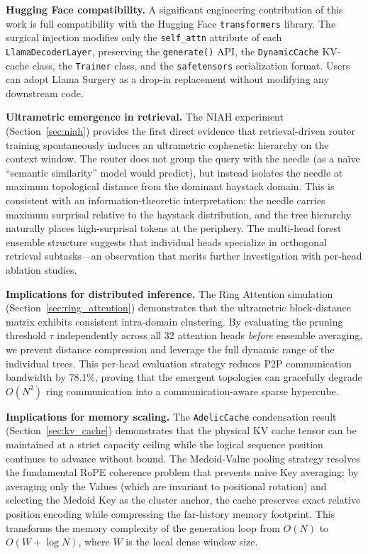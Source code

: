 \documentclass[11pt,a4paper]{article}
\begin{document}
\textbf{Hugging Face compatibility.} A significant engineering contribution of this work is full compatibility with the Hugging Face \texttt{transformers} library. The surgical injection modifies only the \texttt{self\_attn} attribute of each \texttt{LlamaDecoderLayer}, preserving the \texttt{generate()} API, the \texttt{DynamicCache} KV-cache class, the \texttt{Trainer} class, and the \texttt{safetensors} serialization format. Users can adopt Llama Surgery as a drop-in replacement without modifying any downstream code.

\textbf{Ultrametric emergence in retrieval.} The NIAH experiment (Section~\ref{sec:niah}) provides the first direct evidence that retrieval-driven router training spontaneously induces an ultrametric cophenetic hierarchy on the context window. The router does not group the query with the needle (as a na\"ive ``semantic similarity'' model would predict), but instead isolates the needle at maximum topological distance from the dominant haystack domain. This is consistent with an information-theoretic interpretation: the needle carries maximum surprisal relative to the haystack distribution, and the tree hierarchy naturally places high-surprisal tokens at the periphery. The multi-head forest ensemble structure suggests that individual heads specialize in orthogonal retrieval subtasks---an observation that merits further investigation with per-head ablation studies.

\textbf{Implications for distributed inference.} The Ring Attention simulation (Section~\ref{sec:ring_attention}) demonstrates that the ultrametric block-distance matrix exhibits consistent intra-domain clustering. By evaluating the pruning threshold $\tau$ independently across all 32 attention heads \emph{before} ensemble averaging, we prevent distance compression and leverage the full dynamic range of the individual trees. This per-head evaluation strategy reduces P2P communication bandwidth by 78.1\%, proving that the emergent topologies can gracefully degrade $O(N^2)$ ring communication into a communication-aware sparse hypercube.

\textbf{Implications for memory scaling.} The \texttt{AdelicCache} condensation result (Section~\ref{sec:kv_cache}) demonstrates that the physical KV cache tensor can be maintained at a strict capacity ceiling while the logical sequence position continues to advance without bound. The Medoid-Value pooling strategy resolves the fundamental RoPE coherence problem that prevents naive Key averaging: by averaging only the Values (which are invariant to positional rotation) and selecting the Medoid Key as the cluster anchor, the cache preserves exact relative position encoding while compressing the far-history memory footprint. This transforms the memory complexity of the generation loop from $O(N)$ to $O(W + \log N)$, where $W$ is the local dense window size.
\end{document}
